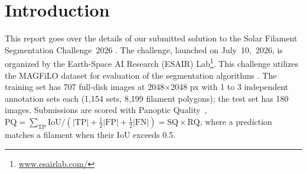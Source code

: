 \documentclass[sigconf]{acmart}
\begin{document}
\maketitle

\ifguideStyle
{}
\par\medskip
\fi



\section{Introduction}
    This report goes over the details of our submitted solution to the Solar Filament Segmentation Challenge~2026 \cite{filament-segmentation-2026}. The challenge, launched on July~10,~2026, is organized by the Earth-Space AI Research (ESAIR) Lab\footnote{\href{https://www.esairlab.com/home}{www.esairlab.com/}}. This challenge utilizes the MAGFiLO dataset for evaluation of the segmentation algorithms \cite{ahmadzadeh2024dataset}. The training set has 707 full-disk images at
    2048$\times$2048 px with 1 to 3 independent annotation sets each (1,154 sets, 8,199 filament polygons);
    the test set has 180 images. Submissions are scored with Panoptic Quality~\cite{kirillov2019panoptic},
    $\mathrm{PQ}=\sum_{\mathrm{TP}}\mathrm{IoU}/(|\mathrm{TP}|+\tfrac12|\mathrm{FP}|+\tfrac12|\mathrm{FN}|)
    =\mathrm{SQ}\times\mathrm{RQ}$, where a prediction matches a filament when their IoU exceeds 0.5.
\end{document}
